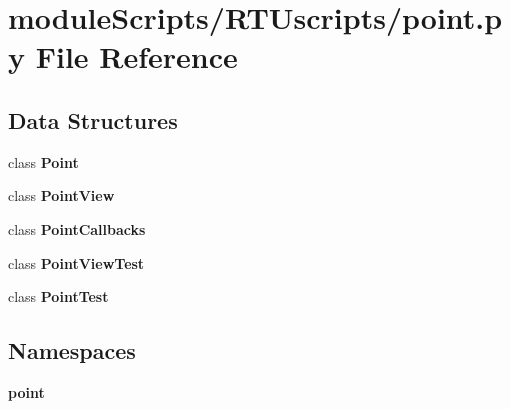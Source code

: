 \section{module\+Scripts/\+R\+T\+Uscripts/point.py File Reference}
\label{point_8py}
\subsection*{Data Structures}
\begin{DoxyCompactItemize}
\item 
class {\bf Point}
\item 
class {\bf Point\+View}
\item 
class {\bf Point\+Callbacks}
\item 
class {\bf Point\+View\+Test}
\item 
class {\bf Point\+Test}
\end{DoxyCompactItemize}
\subsection*{Namespaces}
\begin{DoxyCompactItemize}
\item 
 {\bf point}
\end{DoxyCompactItemize}
